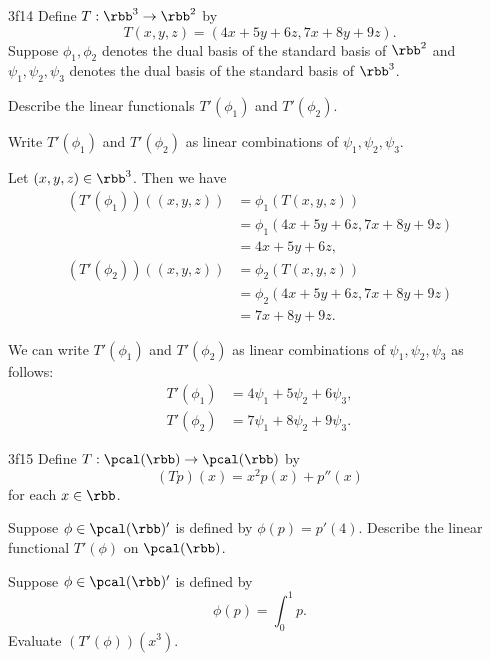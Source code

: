 \begin{exercise}{3f14}
    Define $T: \rbb^3 \to \rbb^2$ by
    \[
    	T(x, y, z) = (4x + 5y + 6z, 7x + 8y + 9z).
    \]
    Suppose $\phi_1, \phi_2$ denotes the dual basis of the standard basis of $\rbb^2$ and $\psi_1, \psi_2, \psi_3$ denotes the dual basis of the standard basis of $\rbb^3$.
    \begin{subexercises}
        \item Describe the linear functionals $T'(\phi_1)$ and $T'(\phi_2)$.
        \item Write $T'(\phi_1)$ and $T'(\phi_2)$ as linear combinations of $\psi_1, \psi_2, \psi_3$.
    \end{subexercises}
\end{exercise}

\begin{solenum}
    \item Let $(x, y, z) \in \rbb^3$.
	Then we have
    \begin{align*}
        (T'(\phi_1))((x, y, z)) &= \phi_1(T(x, y, z)) \\
        &= \phi_1(4x + 5y + 6z, 7x + 8y + 9z) \\
        &= 4x + 5y + 6z, \\
        (T'(\phi_2))((x, y, z)) &= \phi_2(T(x, y, z)) \\
        &= \phi_2(4x + 5y + 6z, 7x + 8y + 9z) \\
        &= 7x + 8y + 9z.
    \end{align*}
    \item We can write $T'(\phi_1)$ and $T'(\phi_2)$ as linear combinations of $\psi_1, \psi_2, \psi_3$ as follows:
    \begin{align*}
        T'(\phi_1) &= 4\psi_1 + 5\psi_2 + 6\psi_3, \\
        T'(\phi_2) &= 7\psi_1 + 8\psi_2 + 9\psi_3.
    \end{align*} \qedhere
\end{solenum}

\begin{exercise}{3f15}
    Define $T: \pcal(\rbb) \to \pcal(\rbb)$ by
    \[
    	(Tp)(x) = x^2 p(x) + p''(x)
    \]
    for each $x \in \rbb$.
    \begin{subexercises}
        \item Suppose $\phi \in \pcal(\rbb)'$ is defined by $\phi(p) = p'(4)$.
	Describe the linear functional $T'(\phi)$ on $\pcal(\rbb)$.
        \item Suppose $\phi \in \pcal(\rbb)'$ is defined by
        \[
        	\phi(p) = \int_0^1 p.
        \]
        Evaluate $(T'(\phi))(x^3)$.
    \end{subexercises}
\end{exercise}

